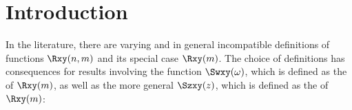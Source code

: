 

\section{Introduction}
In the literature, there are varying and in general incompatible definitions of
 functions $\Rxy(n,m)$ and its  special case $\Rxy(m)$. %
The choice of definitions has consequences for results involving the  function 
$\Swxy(\omega)$, %
which is defined as the  of $\Rxy(m)$,
as well as the more general $\Szxy(z)$, 
which is defined as the  of $\Rxy(m)$:
\begin{definition}\label{def:Swxy}\label{def:Szxy}
\end{definition}

